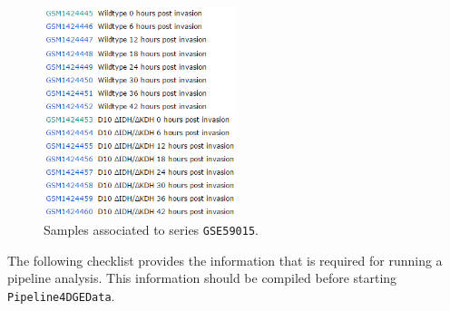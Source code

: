 \documentclass[final,letterpaper,12pt]{article}
\begin{document}
\begin{figure}
	\centering
	\includegraphics[width=0.5\textwidth]{GSE59015samples}
	\caption{Samples associated to series \texttt{GSE59015}.}
	\label{fig:GSE59015samples}
\end{figure}

\par The following checklist provides the information that is required for running a pipeline analysis. This information should be compiled before starting \texttt{Pipeline4DGEData}.
\end{document}
